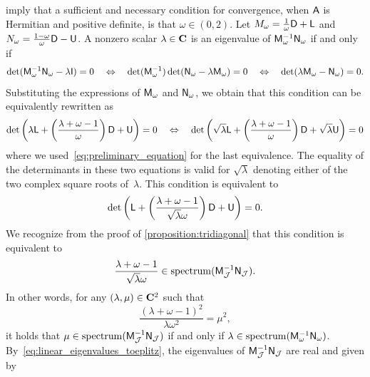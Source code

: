 \begin{solution}
     imply that a sufficient and necessary condition for convergence,
    when $\mathsf A$ is Hermitian and positive definite, is that $\omega \in (0, 2)$.
    Let $M_{\omega} = \frac{1}{\omega} \mathsf D + \mathsf L$ and $N_{\omega} = \frac{1-\omega}{\omega} \mathsf D - \mathsf U$.
    A nonzero scalar $\lambda \in \mathbf C$ is an eigenvalue of $\mathsf M_{\omega}^{-1} \mathsf N_{\omega}$ if and only if
    \[
        \det(\mathsf M_{\omega}^{-1} \mathsf N_{\omega} - \lambda \mathsf I) = 0
        \quad \Leftrightarrow \quad
        \det(\mathsf M_{\omega}^{-1}) \det(\mathsf N_{\omega} - \lambda \mathsf M_{\omega}) = 0
        \quad \Leftrightarrow \quad
        \det(\lambda \mathsf M_{\omega} - \mathsf N_{\omega}) = 0.
    \]
    Substituting the expressions of $\mathsf M_{\omega}$ and $\mathsf N_{\omega}$,
    we obtain that this condition can be equivalently rewritten as
    \[
        \det\left(\lambda \mathsf L + \left(\frac{\lambda + \omega - 1}{\omega}\right) \mathsf D + \mathsf U\right) = 0
        \quad \Leftrightarrow \quad
        \det\left(\sqrt{\lambda} \mathsf L + \left(\frac{\lambda + \omega - 1}{\omega}\right) \mathsf D + \sqrt{\lambda}\mathsf U\right) = 0
    \]
    where we used~\eqref{eq:preliminary_equation} for the last equivalence.
    The equality of the determinants in these two equations is valid for
    $\sqrt{\lambda}$ denoting either of the two complex square roots of~$\lambda$.
    This condition is equivalent to
    \[
        \det\left(\mathsf L + \left(\frac{\lambda + \omega - 1}{\sqrt{\lambda}\omega}\right) \mathsf D + \mathsf U\right) = 0.
    \]
    We recognize from the proof of \cref{proposition:tridiagonal}
    that this condition is equivalent to
    \[
        \frac{\lambda + \omega - 1}{\sqrt{\lambda}\omega}  \in \operatorname{spectrum}(\mathsf M_{\mathcal J}^{-1} \mathsf N_{\mathcal J}).
    \]
    In other words, for any $(\lambda, \mu) \in \mathbf C^2$ such that
    \begin{equation}
        \label{eq:relationship_lambda_mu}
        \frac{(\lambda + \omega - 1)^2}{\lambda\omega^2} = \mu^2,
    \end{equation}
    it holds that $\mu \in \operatorname{spectrum}(\mathsf M_{\mathcal J}^{-1} \mathsf N_{\mathcal J})$ if and only if $\lambda \in \operatorname{spectrum}(\mathsf M_{\omega}^{-1} \mathsf N_{\omega})$.
    By~\eqref{eq:linear_eigenvalues_toeplitz},
    the eigenvalues of $\mathsf M_{\mathcal J}^{-1} \mathsf N_{\mathcal J}$ are real and given by
    \begin{equation}
        \label{eq:explicit_eigenvalues_jacobi}

\end{equation}
\end{solution}
